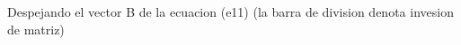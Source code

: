 \documentclass{article}
\begin{document}
\begin{maplegroup}
\mapleresult
\begin{maplelatex}
\end{maplelatex}
\end{maplegroup}
\begin{Maple Normal}{
\begin{Maple Normal}{
Despejando el vector B de la ecuacion (e11) (la barra de division denota invesion de matriz)}\end{Maple Normal}

}\end{Maple Normal}
\end{document}
